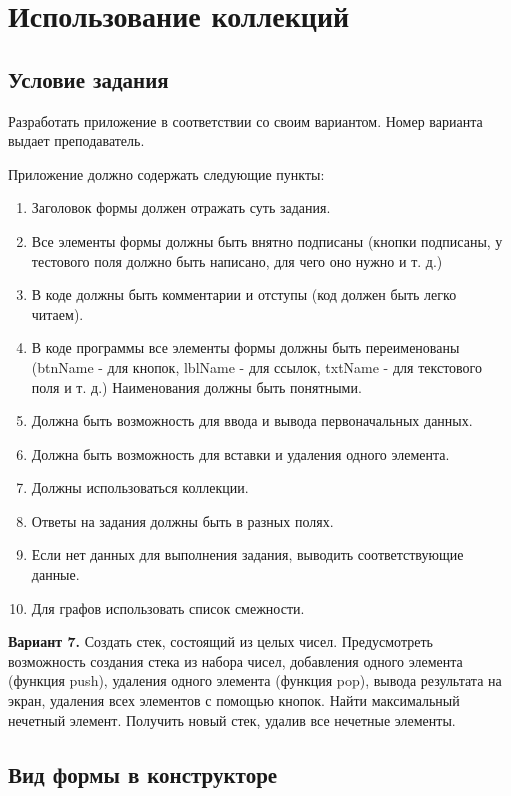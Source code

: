 \section{Использование коллекций}

\subsection{Условие задания}

Разработать приложение в соответствии со своим вариантом. Номер варианта выдает преподаватель. 

Приложение должно содержать следующие пункты:

\begin{enumerate}
    \item Заголовок формы должен отражать суть задания.
    \item Все элементы формы должны быть внятно подписаны (кнопки подписаны, у тестового поля должно быть написано, для чего оно нужно и т. д.)
    \item В коде должны быть комментарии и отступы (код должен быть легко читаем).
    \item В коде программы все элементы формы должны быть переименованы (btnName -  для кнопок, lblName - для ссылок, txtName - для текстового поля и т. д.) Наименования должны быть понятными.
    \item Должна быть возможность для ввода и вывода первоначальных данных.
    \item Должна быть возможность для вставки и удаления одного элемента.
    \item Должны использоваться коллекции.
    \item Ответы на задания должны быть в разных полях.
    \item Если нет данных для выполнения задания, выводить соответствующие данные.
    \item Для графов использовать список смежности.
\end{enumerate}

\textbf{Вариант 7.} Создать стек, состоящий из целых чисел. Предусмотреть возможность создания стека из набора чисел, добавления одного элемента (функция push), удаления одного элемента (функция pop), вывода результата на экран, удаления всех элементов с помощью кнопок. Найти максимальный нечетный элемент. Получить новый стек, удалив все нечетные элементы.


\subsection{Вид формы в конструкторе}



